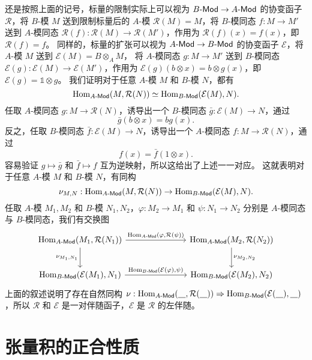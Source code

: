 还是按照上面的记号，标量的限制实际上可以视为 $\text{$B$-\textsf{Mod}}\to\text{$A$-\textsf{Mod}}$ 的协变函子
$\mathcal R$，将 $B$-模 $M$ 送到限制标量后的 $A$-模 $\mathcal R(M)=M$，将 $B$-模同态 $f:M\to M'$ 送到 $A$-模同态
$\mathcal R(f):\mathcal R(M)\to \mathcal R(M')$，作用为 $\mathcal R(f)(x)=f(x)$，即 $\mathcal R(f)=f$。
同样的，标量的扩张可以视为 $\text{$A$-\textsf{Mod}}\to\text{$B$-\textsf{Mod}}$ 的协变函子
$\mathcal E$，将 $A$-模 $M$ 送到 $\mathcal E(M)=B\otimes_AM$，
将 $A$-模同态 $g:M\to M'$ 送到 $B$-模同态 $\mathcal E(g):\mathcal E(M)\to \mathcal E(M')$，作用为
$\mathcal E(g)(b\otimes x)=b\otimes g(x)$，即 $\mathcal E(g)=\mathbb{1}\otimes g$。
我们证明对于任意 $A$-模 $M$ 和 $B$-模 $N$，都有
\[
  \operatorname{Hom}_{\text{$A$-\textsf{Mod}}}  (M,\mathcal R(N))\simeq \operatorname{Hom}_{\text{$B$-\textsf{Mod}}}
  (\mathcal E(M),N).
\]
任取 $A$-模同态 $g:M\to \mathcal R(N)$，诱导出一个 $B$-模同态 $\bar g:\mathcal E(M)\to N$，通过
\[
  \bar g(b\otimes x)=  bg(x).
\]
反之，任取 $B$-模同态 $\bar f:\mathcal E(M)\to N$，诱导出一个 $A$-模同态 $ f:M\to \mathcal R(N)$，通过
\[
   f(x)=\bar f(1\otimes x).  
\]
容易验证 $g\mapsto \bar g$ 和 $\bar f\mapsto f$ 互为逆映射，所以这给出了上述一一对应。
这就表明对于任意 $A$-模 $M$ 和 $B$-模 $N$，有同构
\[
  \nu_{M,N}:   \operatorname{Hom}_{\text{$A$-\textsf{Mod}}}  (M,\mathcal R(N))\to \operatorname{Hom}_{\text{$B$-\textsf{Mod}}}
  (\mathcal E(M),N).
\]
任取 $A$-模 $M_1,M_2$ 和 $B$-模 $N_1,N_2$，$\varphi:M_2\to M_1$ 和 $\psi:N_1\to N_2$ 分别是
$A$-模同态与 $B$-模同态，我们有交换图
\[
  \begin{tikzcd}[row sep=2.4em,column sep=7.2em]
    \Hom_{\text{$A$-\textsf{Mod}}}(M_1,\mathcal R(N_1))
    \arrow[r,"{\Hom_{\text{$A$-\textsf{Mod}}}(\varphi,\mathcal R(\psi))}"]
    \arrow[d,"{\nu_{M_1,N_1}}"']
    &
    \Hom_{\text{$A$-\textsf{Mod}}}(M_2,\mathcal R(N_2))
    \arrow[d,"{\nu_{M_2,N_2}}"] \\
    \Hom_{\text{$B$-\textsf{Mod}}}(\mathcal E(M_1),N_1)
    \arrow[r,"{\Hom_{\text{$B$-\textsf{Mod}}}(\mathcal E(\varphi),\psi)}"]
    &
    \Hom_{\text{$B$-\textsf{Mod}}}(\mathcal E(M_2),N_2)
  \end{tikzcd}  
\]
上面的叙述说明了存在自然同构 
$\nu:\Hom_{\text{$A$-\textsf{Mod}}}(\uline,\mathcal R(\uline))\Rightarrow 
\Hom_{\text{$B$-\textsf{Mod}}}(\mathcal E(\uline),\uline)$，所以 $\mathcal R$ 和 $\mathcal E$
是一对伴随函子，$\mathcal E$ 是 $\mathcal R$ 的左伴随。

\section{张量积的正合性质}

